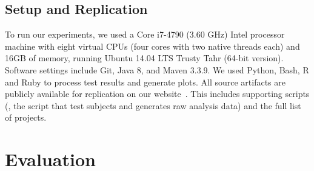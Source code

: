 \subsection{Setup and Replication}
\label{sec:setup}

To run our experiments, we used a Core i7-4790 (3.60 GHz) Intel
processor machine with eight virtual CPUs (four cores with two native
threads each) and 16GB of memory, running Ubuntu 14.04 LTS Trusty Tahr
(64-bit version).  Software settings include Git, Java 8, and Maven
3.3.9.
We used Python, Bash, R and Ruby to
process test results and generate plots.  All source artifacts are
publicly available for replication on our website~\cite{ourwebpage}.
This includes supporting scripts (\eg, the script that test subjects
and generates raw analysis data) and the full list of projects.

\section{Evaluation}
\label{sec:eval}



